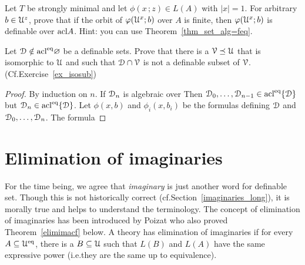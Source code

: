 \begin{exercise}
Let $T$ be strongly minimal and let $\phi(x\,;z)\in L(A)$ with $|x|=1$.
For arbitrary $b\in\EuScript U^z$, prove that if the orbit of $\varphi(\EuScript U^x; b)$ over $A$ is finite, then $\varphi(\EuScript U^x; b)$ is definable over ${\rm acl} A$.
Hint: you can use Theorem~\ref{thm_set_alg=feq}.
\end{exercise}

\begin{exercise}
  Let $\EuScript D\notin{\rm acl}^{{\rm eq}}\varnothing$ be a definable sets.
  Prove that there is a $\EuScript V\preceq\EuScript U$ that is isomorphic to $\EuScript U$ and such that $\EuScript D\cap\EuScript V$ is not a definable subset of $\EuScript V$. (Cf.\@ Exercise~\ref{ex_isosub})
\end{exercise}


\begin{proof}
  By induction on $n$.
  If $\EuScript D_n$ is algebraic over 
  Then $\EuScript D_0,\dots,\EuScript D_{n-1}\in{\rm acl}^{{\rm eq}}\{\EuScript D\}$ but $\EuScript D_n\in{\rm acl}^{{\rm eq}}\{\EuScript D\}$.
  Let $\phi(x,b)$ and $\phi_i(x,b_i)$ be the formulas defining $\EuScript D$ and $\EuScript D_0,\dots,\EuScript D_n$.
  The formula 
\end{proof}

\section{Elimination of imaginaries}\label{elimination_imaginaries}

\def\medrel#1{\parbox[t]{5ex}{$\displaystyle\hfil #1$}}
\def\ceq#1#2#3{\parbox[t]{20ex}{$\displaystyle #1$}\medrel{#2}{$\displaystyle #3$}}

For the time being, we agree that \textit{imaginary\/} is just another word for definable set.
Though this is not historically correct (cf.\@ Section~\ref{imaginaries_long}), it is morally true and helps to understand the terminology.
The concept of elimination of imaginaries has been introduced by Poizat who also proved Theorem~\ref{elimimacf} below.
A theory has elimination of imaginaries if for every $A\subseteq\EuScript U^{{\rm eq}}$, there is a $B\subseteq\EuScript U$ such that $L(B)$ and $L(A)$ have the same expressive power (i.e.\@ they are the same up to equivalence).


